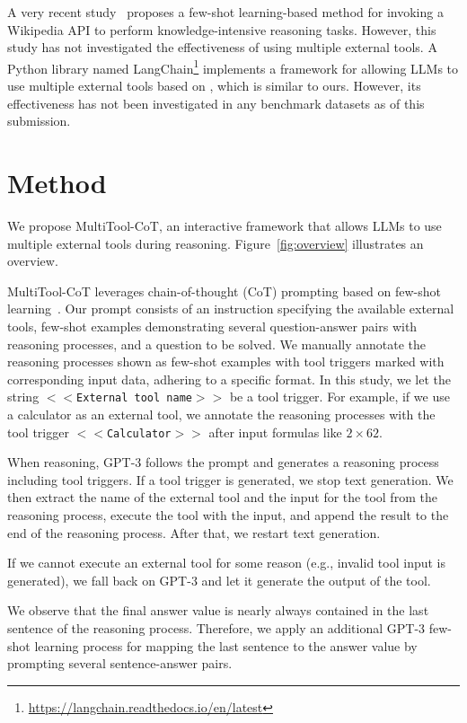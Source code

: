 A very recent study~\cite{ReAct} proposes a few-shot learning-based method for invoking a Wikipedia API to perform knowledge-intensive reasoning tasks.
However, this study has not investigated the effectiveness of using multiple external tools.
A Python library named LangChain\footnote{\url{https://langchain.readthedocs.io/en/latest}} implements a framework for allowing LLMs to use multiple external tools based on \citet{ReAct}, which is similar to ours.
However, its effectiveness has not been investigated in any benchmark datasets as of this submission.

\section{Method}
\label{sec:proposed}

We propose MultiTool-CoT, an interactive framework that allows LLMs to use multiple external tools during reasoning.
Figure~\ref{fig:overview} illustrates an overview.

MultiTool-CoT leverages chain-of-thought (CoT) prompting based on few-shot learning~\cite{wei2022chain}.
Our prompt consists of an instruction specifying the available external tools, few-shot examples demonstrating several question-answer pairs with reasoning processes, and a question to be solved.
We manually annotate the reasoning processes shown as few-shot examples with tool triggers marked with corresponding input data, adhering to a specific format.
In this study, we let the string \texttt{$<<$External tool name$>>$} be a tool trigger.
For example, if we use a calculator as an external tool, we annotate the reasoning processes with the tool trigger \texttt{$<<$Calculator$>>$} after input formulas like $2 \times 62$.

When reasoning, GPT-3 follows the prompt and generates a reasoning process including tool triggers.
If a tool trigger is generated, we stop text generation.
We then extract the name of the external tool and the input for the tool from the reasoning process, execute the tool with the input, and append the result to the end of the reasoning process.
After that, we restart text generation.

If we cannot execute an external tool for some reason (e.g., invalid tool input is generated), we fall back on GPT-3 and let it generate the output of the tool.

We observe that the final answer value is nearly always contained in the last sentence of the reasoning process. Therefore, we apply an additional GPT-3 few-shot learning process for mapping the last sentence to the answer value by prompting several sentence-answer pairs.

